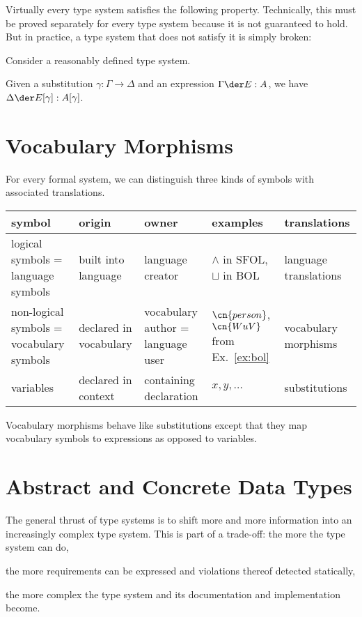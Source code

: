 Virtually every type system satisfies the following property.
Technically, this must be proved separately for every type system because it is not guaranteed to hold.
But in practice, a type system that does not satisfy it is simply broken:

\begin{theorem}
Consider a reasonably defined type system.

Given a substitution $\gamma:\Gamma\to \Delta$ and an expression $\Gamma \der E:A$, we have $\Delta\der E[\gamma]:A[\gamma]$.
\end{theorem}

\section{Vocabulary Morphisms}

For every formal system, we can distinguish three kinds of symbols with associated translations.

\begin{center}
\begin{tabular}{p{3.5cm}|lp{3cm}p{2.5cm}l}
symbol   & origin  & owner  & examples & translations \\
\hline
logical symbols = language symbols & built into language          & language creator  & $\wedge$ in SFOL, $\sqcup$ in BOL & language translations \\
non-logical symbols = vocabulary symbols & declared in vocabulary & vocabulary author = language user & $\cn{person}$, $\cn{WuV}$ from Ex.~\ref{ex:bol} & vocabulary morphisms \\
variables              & declared in context  & containing declaration  & $x, y,\ldots$ & substitutions \\
\end{tabular}
\end{center}

Vocabulary morphisms behave like substitutions except that they map vocabulary symbols to expressions as opposed to variables.

\section{Abstract and Concrete Data Types}

The general thrust of type systems is to shift more and more information into an increasingly complex type system.
This is part of a trade-off: the more the type system can do,
\begin{compactitem}
 \item the more requirements can be expressed and violations thereof detected statically,
 \item the more complex the type system and its documentation and implementation become.
\end{compactitem}

